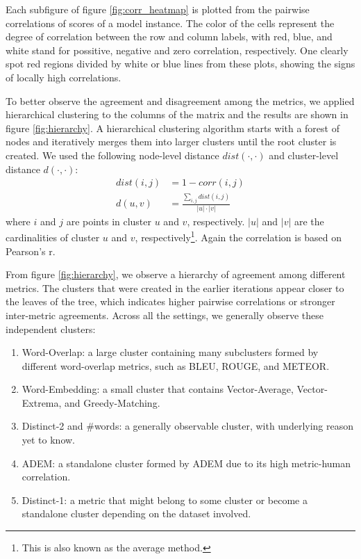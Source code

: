 \documentclass[runningheads]{llncs}
\begin{document}
    Each subfigure of figure \ref{fig:corr_heatmap} is plotted from the pairwise correlations of scores of a model instance. The color of the cells represent the degree of correlation between the row and column labels, with red, blue, and white stand for possitive, negative and zero correlation, respectively. One clearly spot red regions divided by white or blue lines from these plots, showing the signs of locally high correlations.

    To better observe the agreement and disagreement among the metrics, we applied hierarchical clustering to the columns of the matrix and the results are shown in figure \ref{fig:hierarchy}. A hierarchical clustering algorithm starts with a forest of nodes and iteratively merges them into larger clusters until the root cluster is created. We used the following node-level distance $\textit{dist}(\cdot, \cdot)$ and cluster-level distance $d(\cdot, \cdot)$:
    \begin{align}
        \textit{dist}(i, j) &= 1 - \textit{corr}(i, j) \\
        d(u, v) &= \frac{\sum_{i,j}\textit{dist}(i, j)}{|u| \cdot |v|}
    \end{align}
    where $i$ and $j$ are points in cluster $u$ and $v$, respectively. $|u|$ and $|v|$ are the cardinalities of cluster $u$ and $v$, respectively\footnote{This is also known as the average method.}. Again the correlation is based on Pearson's r.

    From figure \ref{fig:hierarchy}, we observe a hierarchy of agreement among different metrics. The clusters that were created in the earlier iterations appear closer to the leaves of the tree, which indicates higher pairwise correlations or stronger inter-metric agreements. Across all the settings, we generally observe these independent clusters:
    \begin{enumerate}
        \item Word-Overlap: a large cluster containing many subclusters formed by different word-overlap metrics, such as BLEU, ROUGE, and METEOR.
        \item Word-Embedding: a small cluster that contains Vector-Average, Vector-Extrema, and Greedy-Matching.
        \item Distinct-2 and \#words: a generally observable cluster, with underlying reason yet to know.
        \item ADEM: a standalone cluster formed by ADEM due to its high metric-human correlation.
        \item Distinct-1: a metric that might belong to some cluster or become a standalone cluster depending on the dataset involved.
    \end{enumerate}
    
\end{document}
